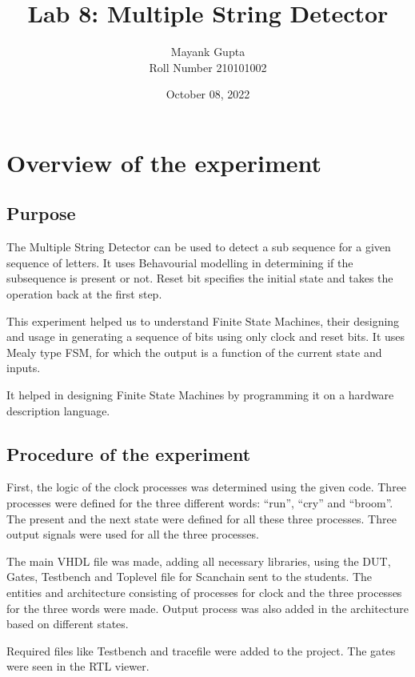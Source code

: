 \documentclass[12pt]{article}
\title{Lab 8: Multiple String Detector}
\author{Mayank Gupta \\ Roll Number 210101002 \\}
\date{October 08, 2022}
\begin{document}
	\maketitle

	\section{Overview of the experiment}
	
	\subsection{Purpose}
	
	The Multiple String Detector can be used to detect a sub sequence for a given sequence of letters. It uses Behavourial modelling in determining if the subsequence is present or not.
	Reset bit specifies the initial state and takes the operation back at the first step.
	
	This experiment helped us to understand Finite State Machines, their designing and usage in generating a sequence of bits using only clock and reset bits. It uses  Mealy type FSM, for which the output is a function of the current state and inputs.
	
	It helped in designing Finite State Machines by programming it on a hardware description language.
	
	\subsection{Procedure of the experiment}
	
	First, the logic of the clock processes was determined using the given code. Three processes were defined for the three different words: ``run'', ``cry'' and ``broom''.
	The present and the next state were defined for all these three processes. Three output signals were used for all the three processes.
	
	
	The main VHDL file was made, adding all necessary libraries, using the DUT, Gates, Testbench and Toplevel file for Scanchain sent to the students. The entities and architecture consisting of processes for clock and the three processes for the three words were made.
	Output process was also added in the architecture based on different states.
	
	Required files like Testbench and tracefile were added to the project. The gates were seen in the RTL viewer. 
	
\end{document}
